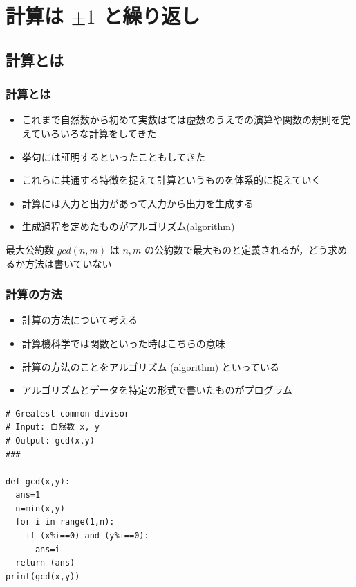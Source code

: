\section{計算は \(\pm 1\) と繰り返し}
\subsection{計算とは}
\begin{frame}
\frametitle{計算とは}
  \begin{itemize}
\item これまで自然数から初めて実数はては虚数のうえでの演算や関数の規則を覚えていろいろな計算をしてきた
\item 挙句には証明するといったこともしてきた
\item これらに共通する特徴を捉えて計算というものを体系的に捉えていく
\item 計算には入力と出力があって入力から出力を生成する
\item 生成過程を定めたものがアルゴリズム(algorithm)
  \end{itemize}
  \begin{example}[最大公約数]
最大公約数 \(gcd(n,m)\) は \(n, m\) の公約数で最大ものと定義されるが，どう求めるか方法は書いていない
  \end{example}
\end{frame}
\begin{frame}
\frametitle{計算の方法}
  \begin{itemize}
\item 計算の方法について考える
\item 計算機科学では関数といった時はこちらの意味
\item 計算の方法のことをアルゴリズム (algorithm) といっている
\item アルゴリズムとデータを特定の形式で書いたものがプログラム
  \end{itemize}
  \begin{lstlisting}[caption={gcd.py}]
# Greatest common divisor
# Input: 自然数 x, y
# Output: gcd(x,y)
###

def gcd(x,y):
  ans=1
  n=min(x,y)
  for i in range(1,n):
    if (x%i==0) and (y%i==0):
      ans=i
  return (ans)
print(gcd(x,y))
  \end{lstlisting}
\end{frame}
